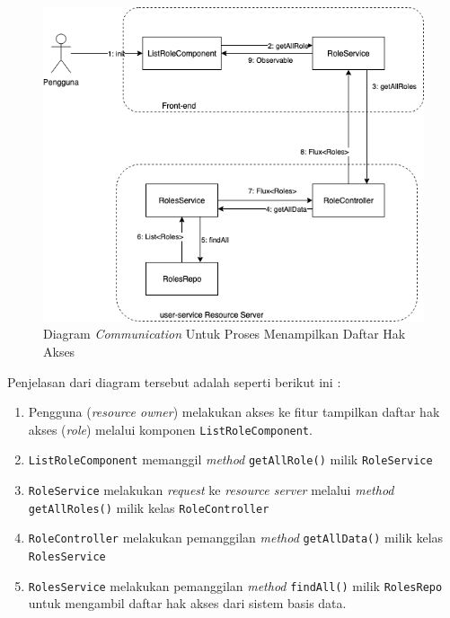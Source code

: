 \documentclass[pdftex,12pt, oneside]{article}
\begin{document}
\begin{itemize}
	\begin{figure}[H]
		\centering
		\includegraphics[width=1\textwidth]{./resources/comm-dia-list-role}
		\caption{Diagram \textit{Communication} Untuk Proses Menampilkan Daftar Hak Akses}
		\label{fig:comm-dia-list-role}
	\end{figure}
	
	Penjelasan dari diagram tersebut adalah seperti berikut ini :
	
	\begin{enumerate}
		\item Pengguna (\textit{resource owner}) melakukan akses ke fitur tampilkan daftar hak akses (\textit{role}) melalui komponen \texttt{ListRoleComponent}.
		
		\item \texttt{ListRoleComponent} memanggil \textit{method} \texttt{getAllRole()} milik \texttt{RoleService}
		
		\item \texttt{RoleService} melakukan \textit{request} ke \textit{resource server} melalui \textit{method} \texttt{getAllRoles()} milik kelas \texttt{RoleController}
		
		\item \texttt{RoleController} melakukan pemanggilan \textit{method} \texttt{getAllData()} milik kelas \texttt{RolesService}
		
		\item \texttt{RolesService} melakukan pemanggilan \textit{method} \texttt{findAll()} milik \texttt{RolesRepo} untuk mengambil daftar hak akses dari sistem basis data.
		

\end{enumerate}
\end{itemize}
\end{document}

